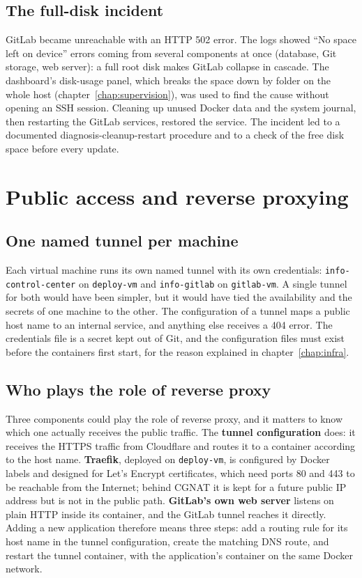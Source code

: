 \subsection{The full-disk incident}
GitLab became unreachable with an HTTP 502 error. The logs showed ``No space left on device'' errors coming from several components at once (database, Git storage, web server): a full root disk makes GitLab collapse in cascade. The dashboard's disk-usage panel, which breaks the space down by folder on the whole host (chapter~\ref{chap:supervision}), was used to find the cause without opening an SSH session. Cleaning up unused Docker data and the system journal, then restarting the GitLab services, restored the service. The incident led to a documented diagnosis-cleanup-restart procedure and to a check of the free disk space before every update.

\section{Public access and reverse proxying}
\label{sec:tunnel-details}
\subsection{One named tunnel per machine}
Each virtual machine runs its own named tunnel with its own credentials: \texttt{info-control-center} on \texttt{deploy-vm} and \texttt{info-gitlab} on \texttt{gitlab-vm}. A single tunnel for both would have been simpler, but it would have tied the availability and the secrets of one machine to the other. The configuration of a tunnel maps a public host name to an internal service, and anything else receives a 404 error. The credentials file is a secret kept out of Git, and the configuration files must exist before the containers first start, for the reason explained in chapter~\ref{chap:infra}.

\subsection{Who plays the role of reverse proxy}
Three components could play the role of reverse proxy, and it matters to know which one actually receives the public traffic. The \textbf{tunnel configuration} does: it receives the HTTPS traffic from Cloudflare and routes it to a container according to the host name. \textbf{Traefik}, deployed on \texttt{deploy-vm}, is configured by Docker labels and designed for Let's Encrypt certificates, which need ports 80 and 443 to be reachable from the Internet; behind CGNAT it is kept for a future public IP address but is not in the public path. \textbf{GitLab's own web server} listens on plain HTTP inside its container, and the GitLab tunnel reaches it directly. Adding a new application therefore means three steps: add a routing rule for its host name in the tunnel configuration, create the matching DNS route, and restart the tunnel container, with the application's container on the same Docker network.

